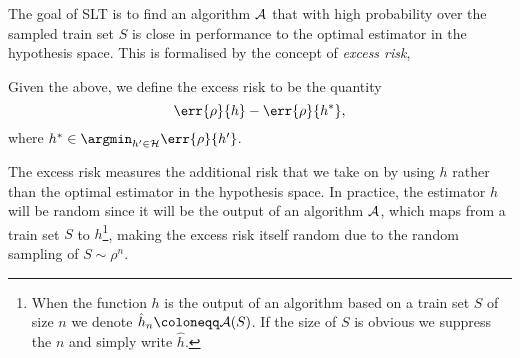 The goal of SLT is to find an algorithm \(\mathcal{A}\) that with high probability
over the sampled train set \(S\) is close in performance to the optimal
estimator in the hypothesis space. This is formalised by the concept of
\emph{excess risk},
\begin{definition}
  \label{def:excess-risk} Given the above, we define the excess risk to be the
quantity
  \begin{equation*}
    \label{eq:excess-risk} \err{\rho}{h} - \err{\rho}{h^{\ast}},
  \end{equation*} where \(h^{\ast} \in \argmin_{h' \in \rkhs{H}}\err{\rho}{h'}\).
\end{definition} The excess risk measures the additional risk that we take on by
using \(h\) rather than the optimal estimator in the hypothesis space. In
practice, the estimator \(h\) will be random since it will be the output of an
algorithm \(\mathcal{A}\), which maps from a train set \(S\) to \(h\)\footnote{When
the function \(h\) is the output of an algorithm based on a train set \(S\) of
size \(n\) we denote \(\hat{h}_{n} \coloneqq \algo(S)\). If the size of \(S\) is
obvious we suppress the \(n\) and simply write \(\hat{h}\).}, making the excess
risk itself random due to the random sampling of \(S \sim \rho^{n}\).


